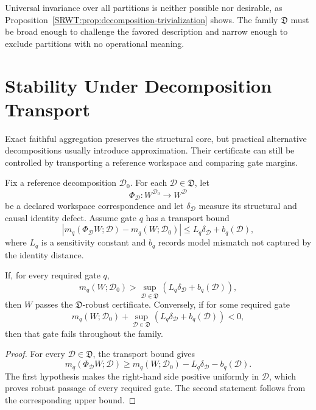 Universal invariance over all partitions is neither possible nor desirable,
as Proposition~\ref{SRWT:prop:decomposition-trivialization} shows. The family
\(\mathfrak D\) must be broad enough to challenge the favored description and
narrow enough to exclude partitions with no operational meaning.

\section{Stability Under Decomposition Transport}

Exact faithful aggregation preserves the structural core, but practical
alternative decompositions usually introduce approximation. Their certificate
can still be controlled by transporting a reference workspace and comparing
gate margins.

Fix a reference decomposition \(\mathcal D_0\). For each
\(\mathcal D\in\mathfrak D\), let
\[
\Phi_{\mathcal D}:W^{\mathcal D_0}\longrightarrow W^{\mathcal D}
\]
be a declared workspace correspondence and let
\(\delta_{\mathcal D}\) measure its structural and causal identity defect.
Assume gate \(q\) has a transport bound
\[
\left|
 m_q(\Phi_{\mathcal D}W;\mathcal D)
 -m_q(W;\mathcal D_0)
\right|
\leq
L_q\delta_{\mathcal D}+b_q(\mathcal D),
\]
where \(L_q\) is a sensitivity constant and \(b_q\) records model mismatch not
captured by the identity distance.

\begin{SRWTtheorem}
\label{SRWT:thm:decomposition-robustness}
If, for every required gate \(q\),
\[
\boxed{
 m_q(W;\mathcal D_0)
>
\sup_{\mathcal D\in\mathfrak D}
\left(
L_q\delta_{\mathcal D}+b_q(\mathcal D)
\right),
}
\]
then \(W\) passes the \(\mathfrak D\)-robust certificate. Conversely, if for
some required gate
\[
 m_q(W;\mathcal D_0)
+
\sup_{\mathcal D\in\mathfrak D}
\left(
L_q\delta_{\mathcal D}+b_q(\mathcal D)
\right)
<0,
\]
then that gate fails throughout the family.
\end{SRWTtheorem}

\begin{proof}
For every \(\mathcal D\in\mathfrak D\), the transport bound gives
\[
 m_q(\Phi_{\mathcal D}W;\mathcal D)
\geq
m_q(W;\mathcal D_0)
-
L_q\delta_{\mathcal D}
-
b_q(\mathcal D).
\]
The first hypothesis makes the right-hand side positive uniformly in
\(\mathcal D\), which proves robust passage of every required gate. The second
statement follows from the corresponding upper bound.
\end{proof}

